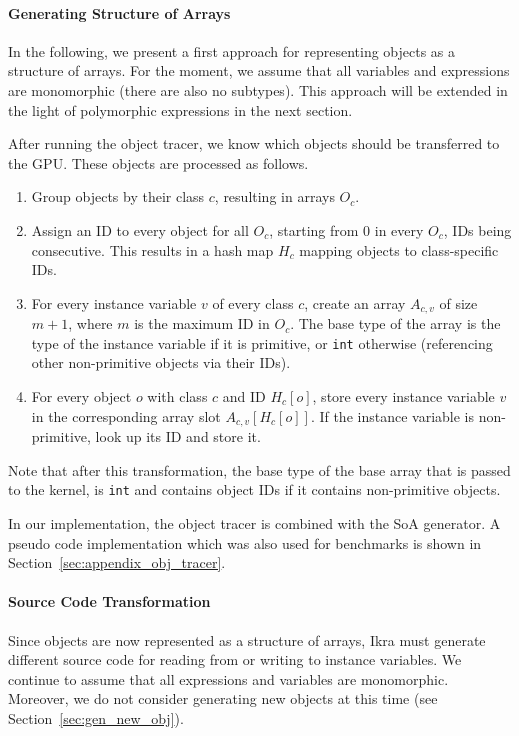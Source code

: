 \documentclass[preprint]{sigplanconf}
\begin{document}
\paragraph{Generating Structure of Arrays}
In the following, we present a first approach for representing objects as a structure of arrays. For the moment, we assume that all variables and expressions are monomorphic (there are also no subtypes). This approach will be extended in the light of polymorphic expressions in the next section.

After running the object tracer, we know which objects should be transferred to the GPU. These objects are processed as follows.
\begin{enumerate}
    \item Group objects by their class $c$, resulting in arrays $O_c$.
    \item Assign an ID to every object for all $O_c$, starting from $0$ in every $O_c$, IDs being consecutive. This results in a hash map $H_c$ mapping objects to class-specific IDs.
    \item For every instance variable $v$ of every class $c$, create an array $A_{c,v}$ of size $m + 1$, where $m$ is the maximum ID in $O_c$. The base type of the array is the type of the instance variable if it is primitive, or \texttt{int} otherwise (referencing other non-primitive objects via their IDs).
    \item For every object $o$ with class $c$ and ID $H_c[o]$, store every instance variable $v$ in the corresponding array slot $A_{c, v}[H_c[o]]$. If the instance variable is non-primitive, look up its ID and store it.
\end{enumerate}

Note that after this transformation, the base type of the base array that is passed to the kernel, is \texttt{int} and contains object IDs if it contains non-primitive objects.

In our implementation, the object tracer is combined with the SoA generator. A pseudo code implementation which was also used for benchmarks is shown in Section~\ref{sec:appendix_obj_tracer}.

\paragraph{Source Code Transformation}
Since objects are now represented as a structure of arrays, Ikra must generate different source code for reading from or writing to instance variables. We continue to assume that all expressions and variables are monomorphic. Moreover, we do not consider generating new objects at this time (see Section~\ref{sec:gen_new_obj}).
\end{document}

